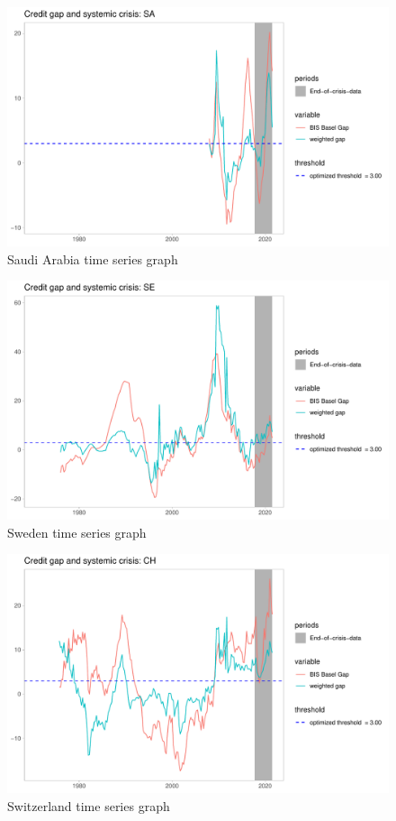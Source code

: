 \documentclass[
  12pt,
]{article}
\begin{document}
\begin{figure}[H]

{\centering \includegraphics[width=0.85\linewidth]{../Data/Output/Graphs/All/Weighted_credit_gap_SA} 

}

\caption{Saudi Arabia time series graph}\label{fig:SAseries}
\end{figure}

\begin{figure}[H]

{\centering \includegraphics[width=0.85\linewidth]{../Data/Output/Graphs/All/Weighted_credit_gap_SE} 

}

\caption{Sweden time series graph}\label{fig:SEseries}
\end{figure}

\begin{figure}[H]

{\centering \includegraphics[width=0.85\linewidth]{../Data/Output/Graphs/All/Weighted_credit_gap_CH} 

}

\caption{Switzerland time series graph}\label{fig:CHseries}
\end{figure}
\end{document}
